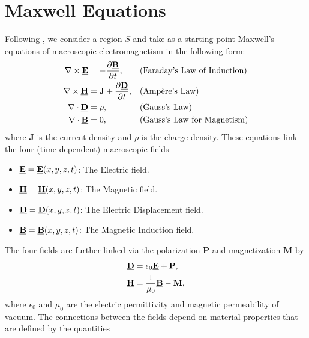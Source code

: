 \vspace{-1.8mm}
\section{Maxwell Equations}
\label{intro:maxwell}
\vspace{-1mm}
Following \cite{Jackson75,BillinghamKing00,HOPS_Notes,Petit80,maier2007plasmonics}, we consider a region $S$ and take as a starting point Maxwell's equations of macroscopic electromagnetism in the following form:
\begin{subequations}
\begin{align}
\nabla \times \textbf{\underline{E}} &= -\frac{\partial \textbf{\underline{B}}}{\partial t}, &&\text{(Faraday's Law of Induction)}\\
\nabla \times \textbf{\underline{H}} &= \textbf{J} + \frac{\partial \textbf{\underline{D}}}{\partial t},&&\text{(Ampère's Law)}\\
\nabla\cdot \textbf{\underline{D}} &= \rho,&&\text{(Gauss's Law)}\\
\nabla\cdot \textbf{\underline{B}}&=0, &&\text{(Gauss's Law  for Magnetism)}
\end{align}
\end{subequations}
where $\textbf{J}$ is the current density and $\rho$ is the charge density. These equations link the four (time dependent) macroscopic fields
\begin{itemize}
    \item $\textbf{\underline{E}}=\textbf{\underline{E}}(x,y,z,t)$: The Electric field.
    \item $\textbf{\underline{H}}=\textbf{\underline{H}}(x,y,z,t)$: The Magnetic field.
    \item $\textbf{\underline{D}}=\textbf{\underline{D}}(x,y,z,t)$: The Electric Displacement field.
    \item $\textbf{\underline{B}}=\textbf{\underline{B}}(x,y,z,t)$: The Magnetic Induction field.
\end{itemize}
The four fields are further linked via the polarization \textbf{P} and magnetization \textbf{M} by
\begin{align*}
\textbf{\underline{D}} & = \epsilon_0\textbf{\underline{E}} + \textbf{P}, \\
\textbf{\underline{H}} & = \frac{1}{\mu_0}\textbf{\underline{B}} - \textbf{M},
\end{align*}
where $\epsilon_0$ and $\mu_0$ are the electric permittivity and magnetic permeability of vacuum. The connections between the fields depend on material properties that are defined by the quantities
